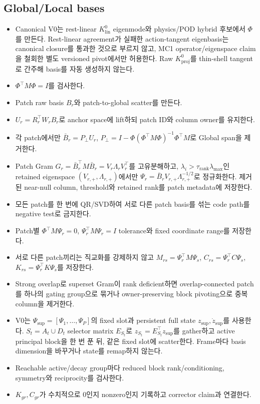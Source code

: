 \documentclass[10pt,a4paper]{article}
\newcommand{\todo}{\textcolor{TodoGray}{\(\square\)}}
\begin{document}
\subsection*{Global/Local bases}

\begin{itemize}
  \item[\todo] Canonical V0는 rest-linear \(K_{\mathrm{lin}}^0\) eigenmode와
  physics/POD hybrid 후보에서 \(\Phi\)를 만든다. Rest-linear agreement가 실패한
  action-tangent eigenbasis는 canonical closure를 통과한 것으로 부르지 않고,
  MC1 operator/eigenspace claim을 철회한 별도 versioned pivot에서만 허용한다.
  Raw \(K_{\mathrm{proj}}^0\)를 thin-shell tangent로 간주해 basis를 자동 생성하지 않는다.
  \item[\todo] \(\Phi^\top M\Phi=I\)를 검사한다.
  \item[\todo] Patch raw basis \(B_r\)와 patch-to-global scatter를 만든다.
  \item[\todo] \(U_r=R_r^\top W_rB_r\)로 anchor space에 lift하되 patch ID와 column owner를 유지한다.
  \item[\todo] 각 patch에서만 \(\bar B_r=P_\perp U_r\),
  \(P_\perp=I-\Phi(\Phi^\top M\Phi)^{-1}\Phi^\top M\)로 Global span을 제거한다.
  \item[\todo] Patch Gram \(G_r=\bar B_r^\top M\bar B_r=V_r\Lambda_rV_r^\top\)를 고유분해하고,
  \(\lambda_i>\tau_{\mathrm{rank}}\lambda_{\max}\)인 retained eigenspace \((V_{r,+},\Lambda_{r,+})\)에서만
  \(\Psi_r=\bar B_rV_{r,+}\Lambda_{r,+}^{-1/2}\)로 정규화한다.
  제거된 near-null column, threshold와 retained rank를 patch metadata에 저장한다.
  \item[\todo] 모든 patch를 한 번에 QR/SVD하여 서로 다른 patch basis를 섞는 code path를 negative test로 금지한다.
  \item[\todo] Patch별 \(\Phi^\top M\Psi_r=0\), \(\Psi_r^\top M\Psi_r=I\) tolerance와 fixed coordinate range를 저장한다.
  \item[\todo] 서로 다른 patch끼리는 직교화를 강제하지 않고
  \(M_{rs}=\Psi_r^\top M\Psi_s\), \(C_{rs}=\Psi_r^\top C\Psi_s\),
  \(K_{rs}=\Psi_r^\top K\Psi_s\)를 저장한다.
  \item[\todo] Strong overlap로 superset Gram이 rank deficient하면 overlap-connected patch를 하나의 gating group으로 묶거나 owner-preserving block pivoting으로 중복 column을 제거한다.
  \item[\todo] V0는 \(\Psi_{\mathrm{sup}}=[\Psi_1,\ldots,\Psi_P]\)의 fixed slot과 persistent full state
  \(z_{\mathrm{sup}},\dot z_{\mathrm{sup}}\)를 사용한다.
  \(S_t=A_t\cup D_t\) selector matrix \(E_{S_t}\)로
  \(z_{S_t}=E_{S_t}^\top z_{\mathrm{sup}}\)를 gather하고 active principal block을 한 번 푼 뒤,
  같은 fixed slot에 scatter한다. Frame마다 basis dimension을 바꾸거나 state를 remap하지 않는다.
  \item[\todo] Reachable active/decay group마다 reduced block rank/conditioning, symmetry와 reciprocity를 검사한다.
  \item[\todo] \(K_{gr},C_{gr}\)가 수치적으로 0인지 nonzero인지 기록하고 corrector claim과 연결한다.
\end{itemize}
\end{document}

